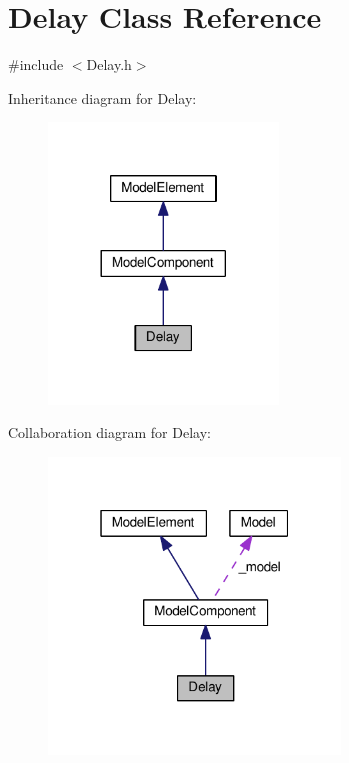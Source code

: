 \hypertarget{class_delay}{}\section{Delay Class Reference}
\label{class_delay}


{\ttfamily \#include $<$Delay.\+h$>$}



Inheritance diagram for Delay\+:\nopagebreak
\begin{figure}[H]
\begin{center}
\leavevmode
\includegraphics[width=173pt]{class_delay__inherit__graph}
\end{center}
\end{figure}


Collaboration diagram for Delay\+:\nopagebreak
\begin{figure}[H]
\begin{center}
\leavevmode
\includegraphics[width=220pt]{class_delay__coll__graph}
\end{center}
\end{figure}
